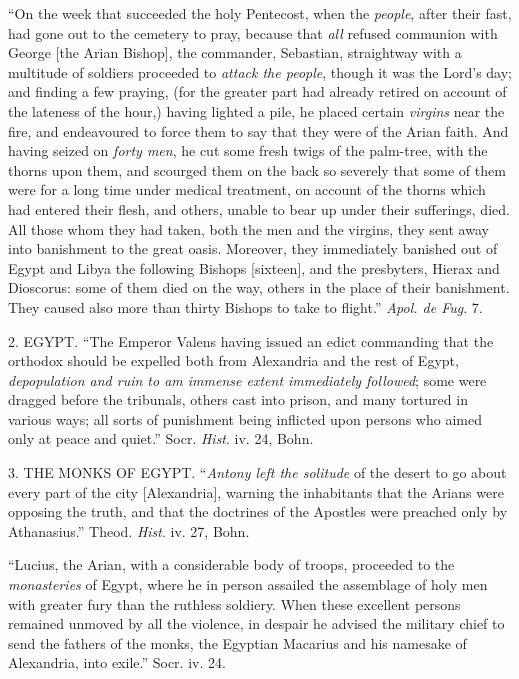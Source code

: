 ``On the week that succeeded the holy Pentecost,
when the \emph{people}, after their fast, had gone out to the cemetery
to pray, because that \emph{all} refused communion with George [the
Arian Bishop], the commander, Sebastian, straightway with a multitude of
soldiers proceeded to \emph{attack the people}, though it was the Lord's
day; and finding a few praying, (for the greater part had already
retired on account of the lateness of the hour,) having lighted a pile,
he placed certain \emph{virgins} near the fire, and endeavoured to force
them to say that they were of the Arian faith. And having seized on \emph{forty
men}, he cut some fresh twigs of the palm-tree, with the thorns upon
them, and scourged them on the back so severely that some of them were
for a long time under medical treatment, on account of the thorns which
had entered their flesh, and others, unable to bear up under their
sufferings, died. All those whom they had taken, both the men and the
virgins, they sent away into banishment to the great oasis. Moreover,
they immediately banished out of Egypt and Libya the following Bishops
[sixteen], and the presbyters, Hierax and Dioscorus: some of them died
on the way, others in the place of their banishment. They caused also
more than thirty Bishops to take to flight.'' \emph{Apol. de Fug}. 7.

2. EGYPT.
``The Emperor Valens having issued an edict commanding that the orthodox
should be expelled both from Alexandria and the rest of Egypt, \emph{depopulation
and ruin to am immense extent immediately followed}; some were
dragged before the tribunals, others cast into prison, and many
tortured in various ways; all sorts of punishment being inflicted upon
persons who aimed only at peace and quiet.'' Socr. \emph{Hist}. iv. 24,
Bohn.

3. THE
MONKS OF
EGYPT. ``\emph{Antony
left the solitude} of the desert to go about every part of the city
[Alexandria], warning the inhabitants that the Arians were opposing the
truth, and that the doctrines of the Apostles were preached only by
Athanasius.'' Theod. \emph{Hist}. iv. 27, Bohn.

``Lucius, the Arian, with a considerable body of
troops, proceeded to the \emph{monasteries} of Egypt, where he in person
assailed the assemblage of holy men with greater fury than the ruthless
soldiery. When these excellent persons remained unmoved by all the
violence, in despair he advised the military chief to send the fathers
of the monks, the Egyptian Macarius and his namesake of Alexandria, into
exile.'' Socr. iv. 24.

